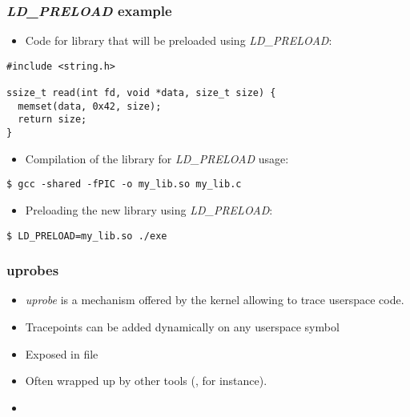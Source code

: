 \begin{frame}[fragile]
  \frametitle{{\em LD\_PRELOAD} example}
  \begin{itemize}
    \item Code for library that will be preloaded using {\em LD\_PRELOAD}:
  \end{itemize}
  \begin{block}{}
    \begin{verbatim}
#include <string.h>

ssize_t read(int fd, void *data, size_t size) {
  memset(data, 0x42, size);
  return size;
}
    \end{verbatim}
  \end{block}
  \begin{itemize}
    \item Compilation of the library for {\em LD\_PRELOAD} usage:
  \end{itemize}
  \begin{block}{}
    \begin{verbatim}
$ gcc -shared -fPIC -o my_lib.so my_lib.c
    \end{verbatim}
  \end{block}

  \begin{itemize}
    \item Preloading the new library using {\em LD\_PRELOAD}:
  \end{itemize}
  \begin{block}{}
    \begin{verbatim}
$ LD_PRELOAD=my_lib.so ./exe
    \end{verbatim}
  \end{block}
\end{frame}

\begin{frame}[fragile]
  \frametitle{uprobes}
  \begin{itemize}
    \item {\em uprobe} is a mechanism offered by the kernel allowing to trace
          userspace code.
    \item Tracepoints can be added dynamically on any userspace symbol
    \item Exposed in file 
    \item Often wrapped up by other tools (,  for
          instance).
    \item {}
  \end{itemize}
\end{frame}

